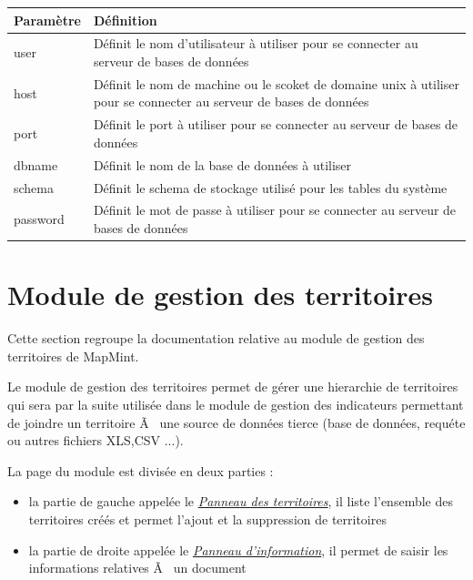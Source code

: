 \documentclass[letterpaper,10pt,french]{sphinxmanual}
\begin{document}
\begin{tabulary}{\linewidth}{|L|L|}
\hline

\textbf{Paramètre}
 & 
\textbf{Définition}
\\
\hline
user
 & 
Définit le nom d'utilisateur à utiliser pour se connecter au serveur de bases de données
\\
\hline
host
 & 
Définit le nom de machine ou le scoket de domaine unix à utiliser pour se connecter au serveur de bases de données
\\
\hline
port
 & 
Définit le port à utiliser pour se connecter au serveur de bases de données
\\
\hline
dbname
 & 
Définit le nom de la base de données à utiliser
\\
\hline
schema
 & 
Définit le schema de stockage utilisé pour les tables du système
\\
\hline
password
 & 
Définit le mot de passe à utiliser pour se connecter au serveur de bases de données
\\
\hline\end{tabulary}



\chapter{Module de gestion des territoires}
\label{territories/index:territories}\label{territories/index::doc}\label{territories/index:module-de-gestion-des-territoires}
Cette section regroupe la documentation relative au module de gestion des territoires de MapMint.

Le module de gestion des territoires permet de gérer une hierarchie de
territoires qui sera par la suite utilisée dans le module de gestion
des indicateurs permettant de joindre un territoire Ã  une source de
données tierce (base de données, requéte ou autres fichiers XLS,CSV ...).

La page du module est divisée en deux parties :
\begin{itemize}
\item {} 
la partie de gauche appelée le {\hyperref[territories/territorieslist::doc]{\emph{\emph{Panneau des territoires}}}}, il liste l'ensemble des territoires créés et permet l'ajout et la suppression de territoires

\item {} 
la partie de droite appelée le {\hyperref[territories/infopanel::doc]{\emph{\emph{Panneau d'information}}}}, il permet de saisir les informations relatives Ã  un document

\end{itemize}
\end{document}
